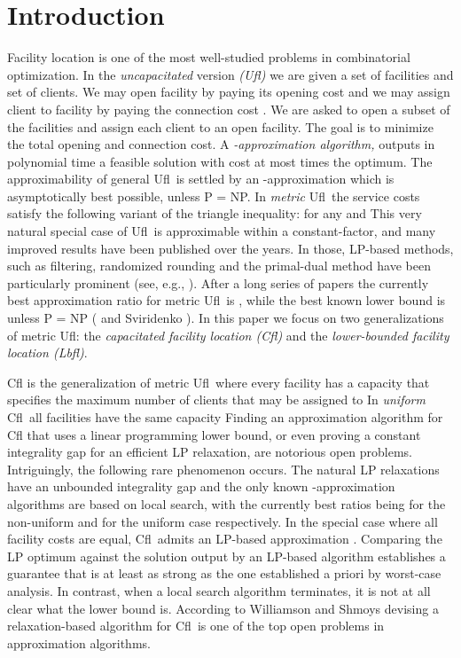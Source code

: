 \documentclass[11pt]{article}
\newcommand{\lbfl}{{\sc Lbfl}}
\newcommand{\cfl}{{\sc Cfl}}
\newcommand{\ufl}{{\sc Ufl}}
\begin{document}
 

\section{Introduction}


Facility location is one of the most well-studied problems in combinatorial optimization.
In the  {\em uncapacitated } version \emph{(\ufl)} we are given a set  of facilities and set  of clients. We may open facility  by paying its opening cost  and we may assign client  to facility  by paying the connection cost . We are asked to open a subset 
 of the facilities and  assign each client to an open
facility. The goal is to minimize the total opening and connection
cost. 
A {\em -approximation algorithm,}  outputs in polynomial time a
feasible solution with cost  at most  times the optimum. 
The approximability of general \ufl\ is settled by an -approximation \cite{Hochbaum82} which is asymptotically best
possible,  unless {\sf P = NP}. In  {\em metric} \ufl\ 
the service costs satisfy the following variant of the triangle inequality:
 for any  and 
This very natural special case of \ufl\ is approximable within a
constant-factor, and many improved results have been published over
the years. In those,   LP-based
methods, such as filtering, randomized rounding and the primal-dual method
 have been particularly prominent (see, e.g., 
\cite{ShmoysWbook}). After a long series of papers 
the currently best approximation ratio for 
 metric \ufl\ is  \cite{Li11}, while the best known lower
bound is  unless {\sf P = NP} (\cite{GuhaK99} and Sviridenko \cite{Vygen05}).
In this paper we focus on two generalizations of metric \ufl:  the 
 {\em capacitated facility location (\cfl\/)} and
 the {\em lower-bounded facility location (\lbfl\/)}.


\cfl\/ is the generalization of  metric \ufl\ where every facility 
has a capacity  that specifies the maximum number of clients that
may be assigned to  In {\em uniform} \cfl\ all facilities have the
same capacity  Finding  an approximation algorithm for \cfl\/ that
uses  a linear  programming lower  bound, or  even proving  a constant
integrality  gap for an  efficient LP  relaxation, are  notorious open
problems. Intriguingly,  the following rare phenomenon occurs. 
The natural LP relaxations  have an unbounded
integrality gap and the only known -approximation algorithms are
based  on local  search,  with  the currently  best  ratios being  
\cite{BansalGG12} for  the non-uniform and   \cite{AggarwalLBGGJ12}
for  the uniform  case respectively.  In  the special  case where  all
facility  costs  are equal,  \cfl\  admits  an LP-based  approximation
\cite{LeviSS12}.  Comparing the LP optimum against the solution output
by an LP-based  algorithm establishes a guarantee that  is at least as
strong  as the  one established  a priori  by worst-case  analysis. In
contrast, when a  local search algorithm terminates, it  is not at all
clear what  the lower  bound is.  According  to  Williamson and Shmoys
\cite{ShmoysWbook} devising a  relaxation-based algorithm for \cfl\ is
one of the top  open problems in approximation algorithms.
\end{document}
